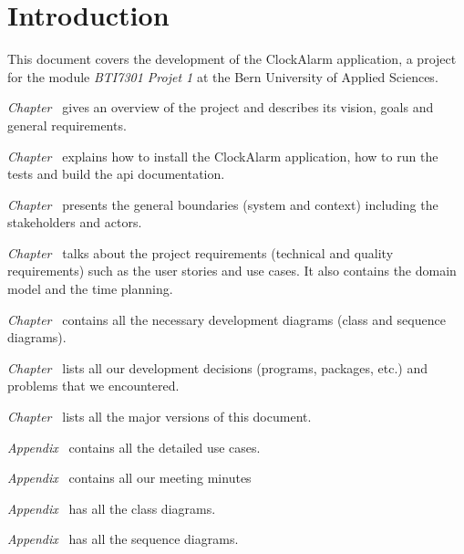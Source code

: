 \chapter{Introduction}

This document covers the development of the ClockAlarm application, a project
for the module \textit{BTI7301 Projet 1} at the Bern University of Applied
Sciences.

\textit{Chapter~} gives an overview of the
project and describes its vision, goals and general requirements.

\textit{Chapter~} explains how to install the
ClockAlarm application, how to run the tests and build the api documentation.

\textit{Chapter~} presents the general boundaries
(system and context) including the stakeholders and actors.

\textit{Chapter~} talks about the project requirements
(technical and quality requirements) such as the user stories and use cases. It
also contains the domain model and the time planning.

\textit{Chapter~} contains all the necessary development
diagrams (class and sequence diagrams).

\textit{Chapter~} lists all our development decisions
(programs, packages, etc.) and problems that we encountered.

\textit{Chapter~} lists all the major versions of this
document.

\textit{Appendix~} contains all the detailed use
cases.

\textit{Appendix~} contains all our meeting minutes

\textit{Appendix~} has all the class diagrams.

\textit{Appendix~} has all the sequence diagrams.
